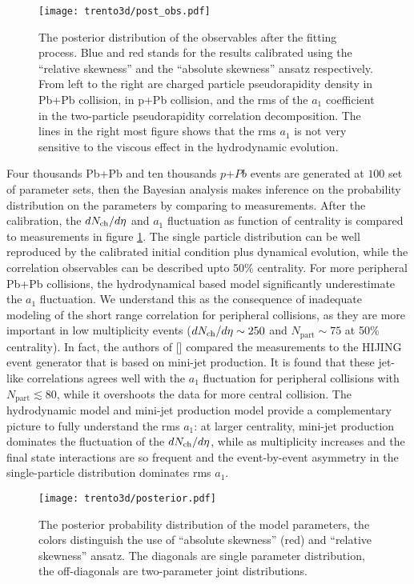 \begin{figure}
\texttt{[image: trento3d/post\_obs.pdf]}
\caption{The posterior distribution of the observables after the fitting process. Blue and red stands for the results calibrated using the ``relative skewness'' and the ``absolute skewness'' ansatz respectively.
From left to the right are charged particle pseudorapidity density in Pb+Pb collision, in p+Pb collision, and the rms of the $a_1$ coefficient in the two-particle pseudorapidity correlation decomposition. The lines in the right most figure shows that the rms $a_1$ is not very sensitive to the viscous effect in the hydrodynamic evolution.}
\label{fig:trento:post_obs}
\end{figure}

Four thousands Pb+Pb and ten thousands $p$+$Pb$ events are generated at $100$ set of parameter sets, then the Bayesian analysis makes inference on the probability distribution on the parameters by comparing to measurements.
After the calibration, the $dN_\text{ch}/d\eta$ and $a_1$ fluctuation as function of centrality is compared to measurements in figure \ref{fig:trento:post_obs}.
The single particle distribution can be well reproduced by the calibrated initial condition plus dynamical evolution, while the correlation observables can be described upto 50\% centrality. 
For more peripheral Pb+Pb collisions, the hydrodynamical based model significantly underestimate the $a_1$ fluctuation.
We understand this as the consequence of inadequate modeling of the short range correlation for peripheral collisions, as they are more important in low multiplicity events ($dN_\text{ch}/d\eta\sim 250$ and $N_{\textrm{part}} \sim 75$ at 50\% centrality).
In fact, the authors of [] compared the measurements to the \mbox{HIJING} event generator that is based on mini-jet production.
It is found that these jet-like correlations agrees well with the $a_1$ fluctuation for peripheral collisions with $N_{\textrm{part}} \lesssim 80$, while it overshoots the data for more central collision.
The hydrodynamic model and mini-jet production model provide a complementary picture to fully understand the rms $a_1$: at larger centrality, mini-jet production dominates the fluctuation of the $dN_\text{ch}/d\eta$, while as multiplicity increases and the final state interactions are so frequent and the event-by-event asymmetry in the single-particle distribution dominates rms $a_1$.

\begin{figure}
\centering
\texttt{[image: trento3d/posterior.pdf]}
\caption{The posterior probability distribution of the model parameters, the colors distinguish the use of ``absolute skewness'' (red) and ``relative skewness'' ansatz. The diagonals are single parameter distribution, the off-diagonals are two-parameter joint distributions.}
\label{fig:trento:posterior}
\end{figure}


